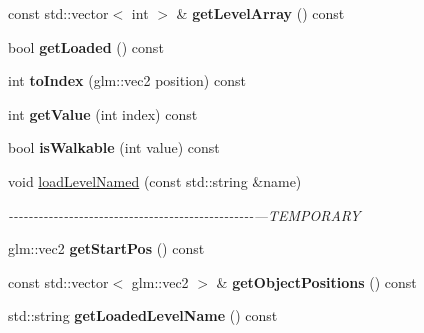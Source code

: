 \begin{DoxyCompactItemize}
\item 
\hypertarget{class_level_a209d4cda525298e007ac0e0bf54ae040}{const std\-::vector$<$ int $>$ \& {\bfseries get\-Level\-Array} () const }\label{class_level_a209d4cda525298e007ac0e0bf54ae040}

\item 
\hypertarget{class_level_a820319e6158473834e215bb709976d32}{bool {\bfseries get\-Loaded} () const }\label{class_level_a820319e6158473834e215bb709976d32}

\item 
\hypertarget{class_level_a28bd20dfbde4b23425325645cfe0c085}{int {\bfseries to\-Index} (glm\-::vec2 position) const }\label{class_level_a28bd20dfbde4b23425325645cfe0c085}

\item 
\hypertarget{class_level_a237518a6fdffb58f2696a12b038a129e}{int {\bfseries get\-Value} (int index) const }\label{class_level_a237518a6fdffb58f2696a12b038a129e}

\item 
\hypertarget{class_level_aa0da8924927f803ab5beef12df6d586f}{bool {\bfseries is\-Walkable} (int value) const }\label{class_level_aa0da8924927f803ab5beef12df6d586f}

\item 
\hypertarget{class_level_ad71b68776ad764243aa34ceb61edbf4b}{void \hyperlink{class_level_ad71b68776ad764243aa34ceb61edbf4b}{load\-Level\-Named} (const std\-::string \&name)}\label{class_level_ad71b68776ad764243aa34ceb61edbf4b}

\begin{DoxyCompactList}\small\item\em -\/-\/-\/-\/-\/-\/-\/-\/-\/-\/-\/-\/-\/-\/-\/-\/-\/-\/-\/-\/-\/-\/-\/-\/-\/-\/-\/-\/-\/-\/-\/-\/-\/-\/-\/-\/-\/-\/-\/-\/-\/-\/-\/-\/-\/-\/-\/-\/-\/---T\-E\-M\-P\-O\-R\-A\-R\-Y \end{DoxyCompactList}\item 
\hypertarget{class_level_aa1bea269cde46a448324e43dd2a480da}{glm\-::vec2 {\bfseries get\-Start\-Pos} () const }\label{class_level_aa1bea269cde46a448324e43dd2a480da}

\item 
\hypertarget{class_level_a35c152b4451c6e98276a923bcaff54be}{const std\-::vector$<$ glm\-::vec2 $>$ \& {\bfseries get\-Object\-Positions} () const }\label{class_level_a35c152b4451c6e98276a923bcaff54be}

\item 
\hypertarget{class_level_a6e8b4ec8dc8a2fe3d59eaddaa8ad0a29}{std\-::string {\bfseries get\-Loaded\-Level\-Name} () const }\label{class_level_a6e8b4ec8dc8a2fe3d59eaddaa8ad0a29}


\end{DoxyCompactItemize}
